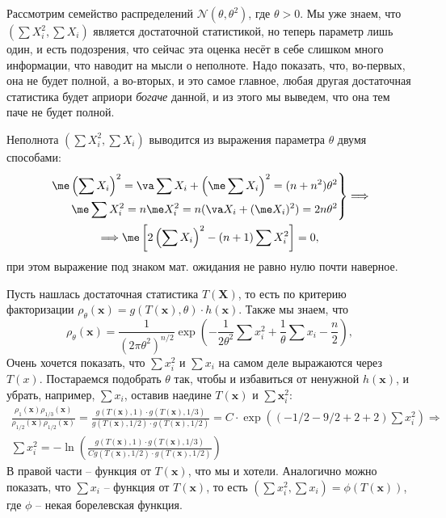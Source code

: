 \begin{example}
    Рассмотрим семейство распределений $\mathcal N(\theta, \theta^2)$, где $\theta > 0$. Мы уже знаем, что $\left(\sum X_i^2, \sum X_i\right)$ является достаточной статистикой, но теперь параметр лишь один, и есть подозрения, что сейчас эта оценка несёт в себе слишком много информации, что наводит на мысли о неполноте. Надо показать, что, во-первых, она не будет полной, а во-вторых, и это самое главное, любая другая достаточная статистика будет априори \textit{богаче} данной, и из этого мы выведем, что она тем паче не будет полной.

    Неполнота $\left(\sum X_i^2, \sum X_i\right)$ выводится из выражения параметра $\theta$ двумя способами:
    \begin{gather*}
    \left.
    \begin{aligned}
        \me \left(\sum X_i\right)^2 = \va \sum X_i + \left(\me \sum X_i\right)^2 = (n+n^2)\theta^2\\
        \me \sum X_i^2 = n \me X_i^2 = n(\va X_i + (\me X_i)^2) = 2n\theta^2
    \end{aligned}\right\}
    \Longrightarrow \\
    \Longrightarrow \me \left[2\left(\sum X_i\right)^2 - (n+1)\sum X_i^2\right] = 0,
    \end{gather*}
    при этом выражение под знаком мат. ожидания не равно нулю почти наверное.
    
    Пусть нашлась достаточная статистика $T(\mathbf X)$, то есть по критерию факторизации $\rho_{\theta}(\mathbf{x})=g(T(\mathbf{x}), \theta)\cdot h(\mathbf{x})$. Также мы знаем, что
    \[
    \rho_{\theta}(\mathbf x) = \frac{1}{(2\pi\theta^2)^{n/2}}\exp\left(-\frac1{2\theta^2}\sum x_i^2 + \frac{1}{\theta}\sum x_i - \frac{n}{2}\right),
    \]
    Очень хочется показать, что $\sum x_i^2$ и $\sum x_i$ на самом деле выражаются через $T(x)$. Постараемся подобрать $\theta$ так, чтобы и избавиться от ненужной $h(\mathbf x)$, и убрать, например, $\sum x_i$, оставив наедине $T(\mathbf x)$ и $\sum \mathbf x_i^2$:
    \begin{gather*}
    \frac{\rho_{1}(\mathbf x)\rho_{1/3}(\mathbf x)}{\rho_{1/2}(\mathbf x)\rho_{1/2}(\mathbf x)} = \frac{g(T(\mathbf x), 1) \cdot g(T(\mathbf x), 1/3)}{g(T(\mathbf x), 1/2) \cdot g(T(\mathbf x), 1/2)} = C\cdot \exp \left((-1/2-9/2+2+2)\sum x_i^2\right) \Longrightarrow\\
    \sum x_i^2 = -\ln\left(\frac{g(T(\mathbf x), 1) \cdot g(T(\mathbf x), 1/3)}{C g(T(\mathbf x), 1/2) \cdot g(T(\mathbf x), 1/2)}\right)
    \end{gather*}
    В правой части -- функция от $T(\mathbf x)$, что мы и хотели. Аналогично можно показать, что $\sum x_i$ -- функция от $T(\mathbf x)$, то есть $\left(\sum x_i^2, \sum x_i\right) = \phi(T(\mathbf x))$, где $\phi$ -- некая борелевская функция.
    

\end{example}
